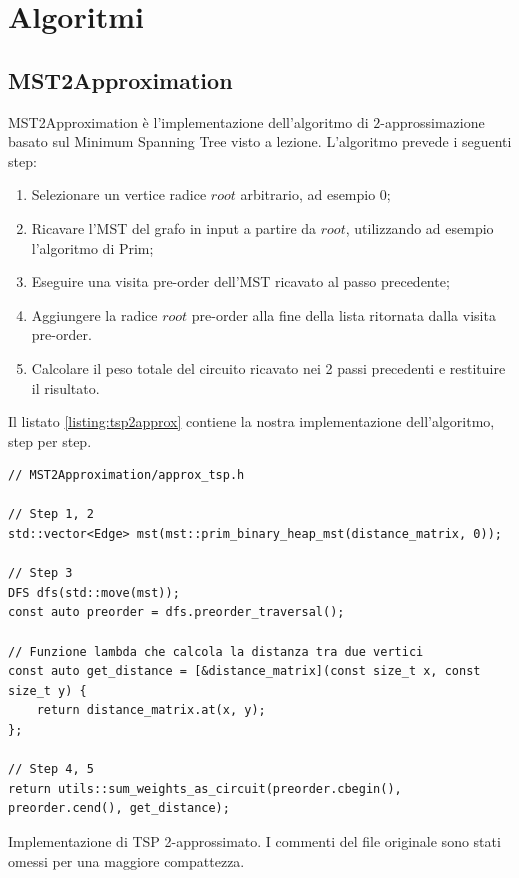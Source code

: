 
\section{Algoritmi}
\label{cap:algorithms}

\subsection{MST2Approximation}

MST2Approximation è l'implementazione dell'algoritmo di $2$-approssimazione basato sul Minimum Spanning Tree visto a lezione. L'algoritmo prevede i seguenti step:

\begin{enumerate}
    \item Selezionare un vertice radice $root$ arbitrario, ad esempio 0;
    \item Ricavare l'MST del grafo in input a partire da $root$, utilizzando ad esempio l'algoritmo di Prim;
    \item Eseguire una visita pre-order dell'MST ricavato al passo precedente;
    \item Aggiungere la radice $root$ pre-order alla fine della lista ritornata dalla visita pre-order.
    \item Calcolare il peso totale del circuito ricavato nei 2 passi precedenti e restituire il risultato.
\end{enumerate}

\noindent Il listato \ref{listing:tsp2approx} contiene la nostra implementazione dell'algoritmo, step per step.\\

\begin{listing}[!ht]
\begin{verbatim}
// MST2Approximation/approx_tsp.h

// Step 1, 2
std::vector<Edge> mst(mst::prim_binary_heap_mst(distance_matrix, 0));

// Step 3
DFS dfs(std::move(mst));
const auto preorder = dfs.preorder_traversal();

// Funzione lambda che calcola la distanza tra due vertici
const auto get_distance = [&distance_matrix](const size_t x, const size_t y) {
    return distance_matrix.at(x, y);
};

// Step 4, 5
return utils::sum_weights_as_circuit(preorder.cbegin(), preorder.cend(), get_distance);
\end{verbatim}
\caption{Implementazione di TSP 2-approssimato. I commenti del file originale sono stati omessi per una maggiore compattezza.}
\label{listing:tsp2approx}
\end{listing}

